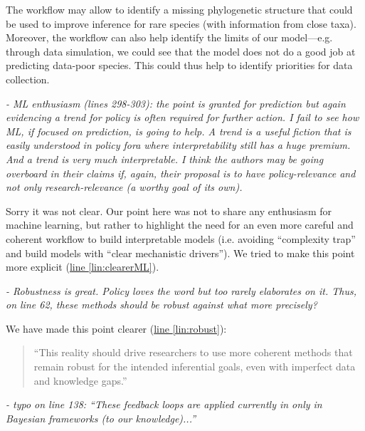 \documentclass[11pt,letter]{article}
\begin{document}
The workflow may allow to identify a missing phylogenetic structure that could be used to improve inference for rare species (with information from close taxa). Moreover, the workflow can also help identify the limits of our model---e.g. through data simulation, we could see that the model does not do a good job at predicting data-poor species. This could thus help to identify priorities for data collection.


\begin{mybox}
\emph{- ML enthusiasm (lines 298-303): the point is granted for prediction but again evidencing a
trend for policy is often required for further action. I fail to see how ML, if focused on
prediction, is going to help. A trend is a useful fiction that is easily understood in policy
fora where interpretability still has a huge premium. And a trend is very much
interpretable. I think the authors may be going overboard in their claims if, again, their
proposal is to have policy-relevance and not only research-relevance (a worthy goal of its
own).}  
\end{mybox}

Sorry it was not clear. Our point here was not to share any enthusiasm for machine learning, but rather to highlight the need for an even more careful and coherent workflow to build interpretable models (i.e. avoiding  ``complexity trap'' and build models with ``clear mechanistic drivers''). We tried to make this point more explicit  (\href{file:forecastflows_r2\#lintarget:clearerML}{line \ref*{lin:clearerML}}).

\begin{mybox}
\emph{- Robustness is great. Policy loves the word but too rarely elaborates on it. Thus, on line 62,
these methods should be robust against what more precisely?}  
\end{mybox}

We have made this point clearer (\href{file:forecastflows_r2\#lintarget:robust}{line \ref*{lin:robust}}):
\begin{quote}
``This reality should drive researchers to use more coherent methods that remain robust for the intended inferential goals, even with imperfect data and knowledge gaps.''
\end{quote}

\begin{mybox}
\emph{- typo on line 138: “These feedback loops are applied currently in only in Bayesian
frameworks (to our knowledge)...”}
\end{mybox}
\end{document}
